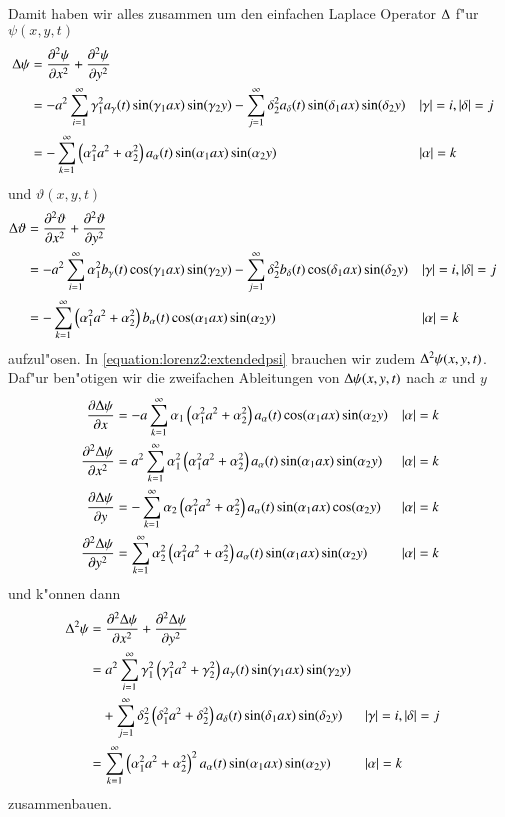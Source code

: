 Damit haben wir alles zusammen um den einfachen Laplace Operator $\laplace$ 
f"ur $\psi(x,y,t)$
\begin{align*}
\laplace\psi
&= 
\frac{\partial^2\psi}{\partial x^2}
+
\frac{\partial^2\psi}{\partial y^2}
\\
&=
-
a^2
\sum_{i = 1}^{\infty}
\gamma_1^2
a_{\gamma}(t)
\sin(\gamma_1 ax) \sin(\gamma_2 y)
-
\sum_{j = 1}^{\infty}
\delta_2^2
a_{\delta}(t) 
\sin(\delta_1 ax) \sin(\delta_2 y)
&&|\gamma| = i, |\delta| = j
\\
&=
-
\sum_{k = 1}^{\infty}
\left(\alpha_1^2 a^2 + \alpha_2^2 \right)
a_{\alpha}(t)
\sin(\alpha_1 ax) \sin(\alpha_2 y)
&&|\alpha| = k
\end{align*}
und $\vartheta(x,y,t)$
\begin{align*}
\laplace\vartheta &= 
\frac{\partial^2\vartheta}{\partial x^2}
+
\frac{\partial^2\vartheta}{\partial y^2} \\
&=
-
a^2
\sum_{i = 1}^{\infty}
\alpha_1^2
b_{\gamma}(t)
\cos(\gamma_1 ax) \sin(\gamma_2 y)
-
\sum_{j = 1}^{\infty}
\delta_2^2
b_{\delta}(t)
\cos(\delta_1 ax) \sin(\delta_2 y)
&&|\gamma| = i, |\delta| = j
\\
&=
-
\sum_{k = 1}^{\infty}
\left(\alpha_1^2 a^2 + \alpha_2^2\right)
b_{\alpha}(t)
\cos(\alpha_1 ax) \sin(\alpha_2 y)
&&|\alpha| = k
\end{align*}
aufzul"osen. In \cref{equation:lorenz2:extendedpsi} brauchen wir zudem 
$\laplace^2\psi(x,y,t)$. Daf"ur ben"otigen wir die zweifachen Ableitungen von 
$\laplace\psi(x,y,t)$ nach $x$ und $y$
\begin{align*}
\frac{\partial\laplace\psi}{\partial x} &=
-
a
\sum_{k = 1}^{\infty}
\alpha_1
\left(\alpha_1^2 a^2 + \alpha_2^2 \right)
a_{\alpha}(t)
\cos(\alpha_1 ax) \sin(\alpha_2 y)
&&|\alpha| = k
\\
\frac{\partial^2\laplace\psi}{\partial x^2}
&=
a^2
\sum_{k = 1}^{\infty}
\alpha_1^2
\left(\alpha_1^2 a^2+\alpha_2^2\right)
a_{\alpha}(t)
\sin(\alpha_1 ax) \sin(\alpha_2 y)
&&|\alpha| = k
\\
\frac{\partial\laplace\psi}{\partial y}
&=
-
\sum_{k = 1}^{\infty}
\alpha_2
\left(\alpha_1^2 a^2 + \alpha_2^2 \right)
a_{\alpha}(t)
\sin(\alpha_1 ax) \cos(\alpha_2 y)
&&|\alpha| = k
\\
\frac{\partial^2\laplace\psi}{\partial y^2}
&=
\sum_{k = 1}^{\infty}
\alpha_2^2
\left(\alpha_1^2 a^2+\alpha_2^2\right)
a_{\alpha}(t)
\sin(\alpha_1 ax) \sin(\alpha_2 y)
&&|\alpha| = k
\end{align*}
und k"onnen dann
\begin{align*}
\laplace^2\psi
&= 
\frac{\partial^2\laplace\psi}{\partial x^2} + 
\frac{\partial^2\laplace\psi}{\partial y^2} \\
&=
a^2
\sum_{i = 1}^{\infty}
\gamma_1^2
\left(\gamma_1^2 a^2+\gamma_2^2\right)
a_{\gamma}(t)
\sin(\gamma_1 ax) \sin(\gamma_2 y)
\\
&\phantom{={}}
+
\sum_{j = 1}^{\infty}
\delta_2^2
\left(\delta_1^2 a^2+\delta_2^2\right)
a_{\delta}(t)
\sin(\delta_1 ax) \sin(\delta_2 y)
&&|\gamma| = i, |\delta| = j
\\
&=
\sum_{k = 1}^{\infty}
\left(\alpha_1^2 a^2+\alpha_2^2\right)^2
a_{\alpha}(t)
\sin(\alpha_1 ax) \sin(\alpha_2 y)
&&|\alpha| = k
\end{align*}
zusammenbauen.

